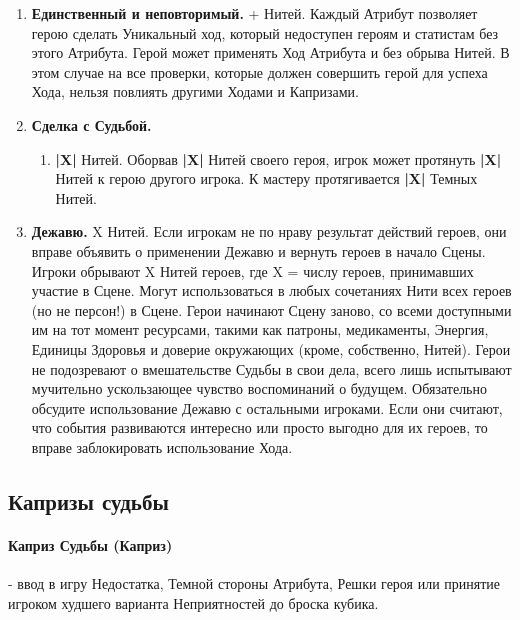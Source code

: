 \begin{enumerate}
    \item \textbf{Единственный и неповторимый.}
    + Нитей. Каждый Атрибут позволяет герою сделать Уникальный ход, который недоступен героям и статистам без этого Атрибута.  
	Герой может применять Ход Атрибута и без обрыва Нитей. В этом случае на все проверки, которые должен совершить герой для успеха Хода, нельзя повлиять другими Ходами и Капризами.

	\item \textbf{Сделка с Судьбой.}
	\begin{enumerate}
        \item \textbf{|X|} Нитей. Оборвав \textbf{|X|} Нитей своего героя, игрок может протянуть \textbf{|X|} Нитей к герою другого игрока. К мастеру протягивается \textbf{|X|} Темных Нитей.
    \end{enumerate}

	\item \textbf{Дежавю.}
	\newline X Нитей. Если игрокам не по нраву результат действий героев, они вправе объявить о применении Дежавю и вернуть героев в начало Сцены. 
    \newline Игроки обрывают X Нитей героев, где X = числу героев, принимавших участие в Сцене. Могут использоваться в любых сочетаниях Нити всех героев (но не персон!) в Сцене.
    \newline Герои начинают Сцену заново, со всеми доступными им на тот момент ресурсами, такими как патроны, медикаменты, Энергия, Единицы Здоровья и доверие окружающих (кроме, собственно, Нитей). Герои не подозревают о вмешательстве Судьбы в свои дела, всего лишь испытывают мучительно ускользающее чувство воспоминаний о будущем.
    \newline Обязательно обсудите использование Дежавю с остальными игроками. Если они считают, что события развиваются интересно или просто выгодно для их героев, то вправе заблокировать использование Хода. 
\end{enumerate}

\subsection{Капризы судьбы}
\paragraph{Каприз Судьбы (Каприз)} - ввод в игру Недостатка, Темной стороны Атрибута, Решки героя или принятие игроком худшего варианта Неприятностей до броска кубика. 
